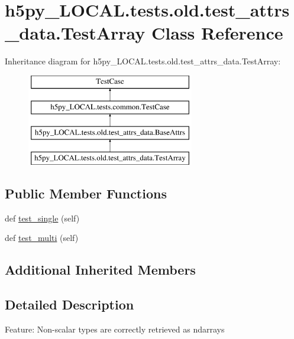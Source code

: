 \hypertarget{classh5py__LOCAL_1_1tests_1_1old_1_1test__attrs__data_1_1TestArray}{}\section{h5py\+\_\+\+L\+O\+C\+A\+L.\+tests.\+old.\+test\+\_\+attrs\+\_\+data.\+Test\+Array Class Reference}
\label{classh5py__LOCAL_1_1tests_1_1old_1_1test__attrs__data_1_1TestArray}
Inheritance diagram for h5py\+\_\+\+L\+O\+C\+A\+L.\+tests.\+old.\+test\+\_\+attrs\+\_\+data.\+Test\+Array\+:\begin{figure}[H]
\begin{center}
\leavevmode
\includegraphics[height=4.000000cm]{classh5py__LOCAL_1_1tests_1_1old_1_1test__attrs__data_1_1TestArray}
\end{center}
\end{figure}
\subsection*{Public Member Functions}
\begin{DoxyCompactItemize}
\item 
def \hyperlink{classh5py__LOCAL_1_1tests_1_1old_1_1test__attrs__data_1_1TestArray_a96021a38ac09442af52018917d9a5c44}{test\+\_\+single} (self)
\item 
def \hyperlink{classh5py__LOCAL_1_1tests_1_1old_1_1test__attrs__data_1_1TestArray_aa5ed71989d7a721deeb18392472119ec}{test\+\_\+multi} (self)
\end{DoxyCompactItemize}
\subsection*{Additional Inherited Members}


\subsection{Detailed Description}
\begin{DoxyVerb}    Feature: Non-scalar types are correctly retrieved as ndarrays
\end{DoxyVerb}
 

